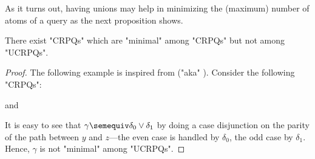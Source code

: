 As it turns out, having unions may help in minimizing the (maximum) number of atoms of a query as the next proposition shows.
\begin{proposition}
	\AP\label{prop:unionsmatter}
	There exist "CRPQs" which are "minimal" among "CRPQs" but not among "UCRPQs".
\end{proposition}
\begin{proof}
	The following example is inspired from \cite[Example 1.2]{FigueiraMorvan2025SemanticTreeWidthLMCS} ("aka"
	).
	Consider the following "CRPQs":\leavevmode
	\begin{center}
		\small
		\hspace{.4cm}
		\hspace{.2cm}and\hspace{.2cm}
	\end{center}
	It is easy to see that $\gamma \semequiv \delta_0 \lor \delta_1$ 
	by doing a case disjunction on the parity of the path between $y$ and $z$---the even case
	is handled by $\delta_0$, the odd case by $\delta_1$.
	Hence, $\gamma$ is not "minimal" among "UCRPQs".
	

\end{proof}
